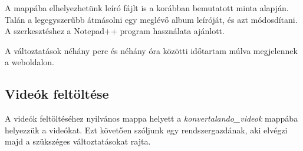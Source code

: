 ﻿\documentclass[12pt]{article}
\begin{document}
A mappába elhelyezhetünk leíró fájlt is a korábban bemutatott minta alapján. Talán a legegyszerűbb átmásolni egy meglévő album leíróját, és azt módosdítani. A szerkesztéshez a Notepad++ program használata ajánlott.

A változtatások néhány perc és néhány óra közötti időtartam múlva megjelennek a weboldalon.

\subsection{Videók feltöltése}
A videók feltöltéséhez nyilvános mappa helyett a \textit{konvertalando\_videok} mappába helyezzük a videókat. Ezt követően szóljunk egy rendszergazdának, aki elvégzi majd a szükszéges változtatásokat rajta.
\end{document}
